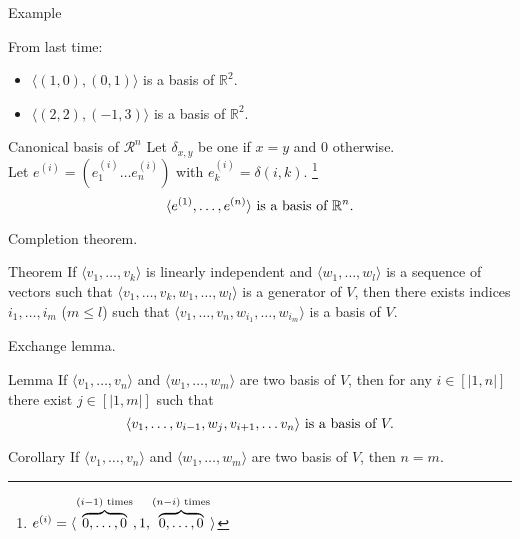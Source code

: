 \documentclass{beamer}
\begin{document}
\begin{frame}{Example}
  \begin{exampleblock}{From last time:}
    \begin{itemize}
    \item $\langle (1,0), (0,1) \rangle$ is a basis of $\mathbb{R}^2$.
    \item $\langle (2,2), (-1,3) \rangle$ is a basis of $\mathbb{R}^2$.
    \end{itemize}
  \end{exampleblock}
\end{frame}

\begin{frame}{Canonical basis of $\mathcal{R}^n$}
    Let $\delta_{x,y}$ be one if $x = y$ and $0$ otherwise.\\
    Let $e^{(i)} = (e^{(i)}_1 \dots e^{(i)}_n)$ with $e^{(i)}_k = \delta(i, k)$. \footnote{$e^{(i)} = \langle \overbrace{0,\dots,0}^{(i-1) \textnormal{ times}}, 1, \overbrace{0,\dots,0}^{(n-i) \textnormal{ times}} \rangle$}
    \[\langle e^{(1)}, \dots, e^{(n)} \rangle \textnormal{ is a basis of } \mathbb{R}^n.\]
\end{frame}

\begin{frame}{Completion theorem.}
  \begin{block}{Theorem}
    If $\langle v_1, \dots, v_k \rangle$ is linearly independent and $\langle w_1, \dots, w_l \rangle$ is a sequence of vectors such that $\langle v_1, \dots, v_k, w_1, \dots, w_l \rangle$ is a generator of $V$, then there exists indices $i_1, \dots, i_m$ ($m \le l$) such that $\langle v_1, \dots, v_n, w_{i_1}, \dots, w_{i_m} \rangle$ is a basis of $V$.
  \end{block}
\end{frame}

\begin{frame}{Exchange lemma.}

  \begin{block}{Lemma}
  If $\langle v_1, \dots, v_n \rangle$ and $\langle w_1, \dots, w_m \rangle$ are two basis of $V$, then for any $i \in [|1, n|]$ there exist $j \in [|1, m|]$ such that
  \[\langle v_{1}, \dots, v_{i-1}, w_j, v_{i+1}, \dots v_n \rangle \textnormal{ is a basis of } V.\]
  \end{block}

  \begin{block}{Corollary}
    If $\langle v_1, \dots, v_n \rangle$ and $\langle w_1, \dots, w_m \rangle$ are two basis of $V$, then $n = m$.
  \end{block}
\end{frame}
\end{document}
